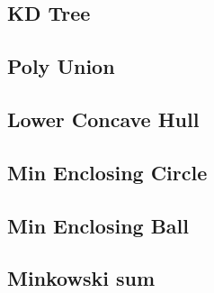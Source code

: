 \documentclass[a4paper,10pt,twocolumn,oneside]{article}
\begin{document}
\subsection{KD Tree}
%


\subsection{Poly Union}


\subsection{Lower Concave Hull}


% 

\subsection{Min Enclosing Circle}


\subsection{Min Enclosing Ball}


%

\subsection{Minkowski sum}


% 

%
\end{document}
